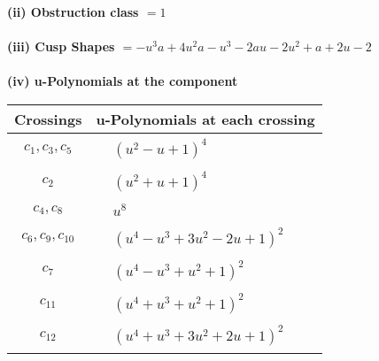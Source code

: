 \documentclass[1p]{elsarticle_modified}
\theoremstyle{definition}
\begin{document}
\flushleft \textbf{(ii) Obstruction class $= 1$}\\~\\
\flushleft \textbf{(iii) Cusp Shapes $= - u^3 a+4 u^2 a- u^3-2 a u-2 u^2+a+2 u-2$}\\~\\
\newpage\renewcommand{\arraystretch}{1}
\flushleft \textbf{(iv) u-Polynomials at the component}\newline \\
\begin{tabular}{m{50pt}|m{274pt}}
Crossings & \hspace{64pt}u-Polynomials at each crossing \\
\hline $$\begin{aligned}c_{1},c_{3},c_{5}\end{aligned}$$&$\begin{aligned}
&(u^2- u+1)^4
\end{aligned}$\\
\hline $$\begin{aligned}c_{2}\end{aligned}$$&$\begin{aligned}
&(u^2+u+1)^4
\end{aligned}$\\
\hline $$\begin{aligned}c_{4},c_{8}\end{aligned}$$&$\begin{aligned}
&u^8
\end{aligned}$\\
\hline $$\begin{aligned}c_{6},c_{9},c_{10}\end{aligned}$$&$\begin{aligned}
&(u^4- u^3+3 u^2-2 u+1)^2
\end{aligned}$\\
\hline $$\begin{aligned}c_{7}\end{aligned}$$&$\begin{aligned}
&(u^4- u^3+u^2+1)^2
\end{aligned}$\\
\hline $$\begin{aligned}c_{11}\end{aligned}$$&$\begin{aligned}
&(u^4+u^3+u^2+1)^2
\end{aligned}$\\
\hline $$\begin{aligned}c_{12}\end{aligned}$$&$\begin{aligned}
&(u^4+u^3+3 u^2+2 u+1)^2
\end{aligned}$\\
\hline
\end{tabular}\\~\\
\end{document}
